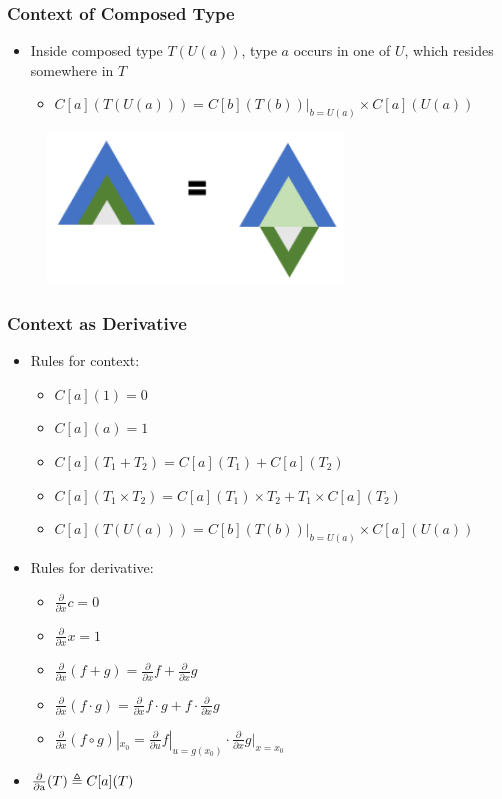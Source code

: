 \begin{frame}
\frametitle{Context of Composed Type}

\begin{itemize}
\item Inside composed type $T(U(a))$, type $a$ occurs in one of $U$,
which resides somewhere in $T$
\begin{itemize}
\item $C[a](T(U(a))) = C[b](T(b))|_{b=U(a)} \times  C[a](U(a))$
\end{itemize}
\end{itemize}

\begin{figure}
\centering
\includegraphics[width=0.7\textwidth]{figure/comp}
\end{figure}
\end{frame}

\begin{frame}
\frametitle{Context as Derivative}
\begin{itemize}
\item Rules for context:
\begin{itemize}
\item $C[a](1) = 0$
\item $C[a](a) = 1$
\item $C[a](T_1 + T_2) = C[a](T_1) + C[a](T_2)$
\item $C[a](T_1 \times  T_2) = C[a](T_1)\times T_2 + T_1\times C[a](T_2)$
\item $C[a](T(U(a))) = C[b](T(b))|_{b=U(a)} \times  C[a](U(a))$
\end{itemize}

\item Rules for derivative:
\begin{itemize}
\item $\frac{\partial}{\partial x}c = 0$
\item $\frac{\partial}{\partial x}x = 1$
\item $\frac{\partial}{\partial x}(f+g) = \frac{\partial}{\partial x}f + \frac{\partial}{\partial x}g$
\item $\frac{\partial}{\partial x}(f\cdot g) = \frac{\partial}{\partial x}f \cdot g
+ f \cdot \frac{\partial}{\partial x}g$
\item $\frac{\partial}{\partial x}(f\circ g)|_{x_0} =
\frac{\partial}{\partial u}f|_{u=g(x_0)}
\cdot \frac{\partial}{\partial x}g|_{x=x_0}$
\end{itemize}

\item $\operatorname{\frac{\partial}{\partial a}} (T) \triangleq C[a](T)$
\end{itemize}
\end{frame}

